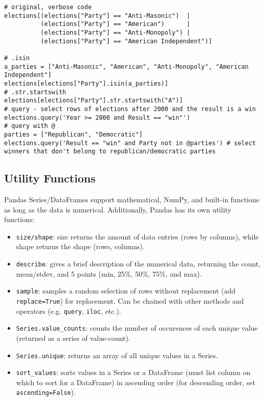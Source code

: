 \begin{verbatim}
# original, verbose code
elections[(elections["Party"] == "Anti-Masonic")  | 
          (elections["Party"] == "American")      |
          (elections["Party"] == "Anti-Monopoly") |
          (elections["Party"] == "American Independent")]

# .isin
a_parties = ["Anti-Masonic", "American", "Anti-Monopoly", "American Independent"]
elections[elections["Party"].isin(a_parties)]
# .str.startswith
elections[elections["Party"].str.startswith("A")]
# query - select rows of elections after 2000 and the result is a win 
elections.query('Year >= 2000 and Result == "win"')
# query with @
parties = ["Republican", "Democratic"]
elections.query('Result == "win" and Party not in @parties') # select winners that don't belong to republican/democratic parties
\end{verbatim}

\subsection{Utility Functions}
Pandas Series/DataFrames support mathematical, NumPy, and built-in functions as long as the data is numerical. Additionally, Pandas has its own utility functions:
\begin{itemize}
\item \texttt{size/shape}: size returns the amount of data entries (rows by columns), while shape returns the shape (rows, columns).
\item \texttt{describe}: gives a brief description of the numerical data, returning the count, mean/stdev, and 5 points (min, 25\%, 50\%, 75\%, and max).
\item \texttt{sample}: samples a random selection of rows without replacement (add \texttt{replace=True}) for replacement. Can be chained with other methods and operators (e.g. \texttt{query}, \texttt{iloc}, etc.).
\item \texttt{Series.value_counts}: counts the number of occurences of each unique value (returned as a series of value-count).
\item \texttt{Series.unique}: returns an array of all unique values in a Series.
\item \texttt{sort_values}: sorts values in a Series or a DataFrame (must list column on which to sort for a DataFrame) in ascending order (for descending order, set \texttt{ascending=False}).
\end{itemize}

